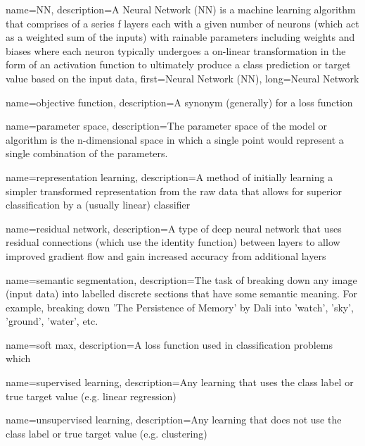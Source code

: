 {
    name={NN},
    description={A Neural Network (NN) is a machine learning algorithm that comprises of a series f layers each with a given number of neurons (which act as a weighted sum of the inputs) with rainable parameters including weights and biases where each neuron typically undergoes a on-linear transformation in the form of an activation function to ultimately produce a class prediction or target value based on the input data},
    first={Neural Network (NN)},
    long={Neural Network}
}

{
    name={objective function},
    description={A synonym (generally) for a loss function \cite[p.~80]{good_fellow_2016}}
}

{
    name={parameter space},
    description={The parameter space of the model or algorithm is the n-dimensional space in which a single point would represent a single combination of the parameters.}
}

{
    name=representation learning,
    description={A method of initially learning a simpler transformed representation from the raw data that allows for superior classification by a (usually linear) classifier}
}

{
    name=residual network,
    description={A type of deep neural network that uses residual connections (which use the identity function) between layers to allow improved gradient flow and gain increased accuracy from additional layers}
}

{
    name=semantic segmentation,
    description={The task of breaking down any image (input data) into labelled discrete sections that have some semantic meaning. For example, breaking down 'The Persistence of Memory' by Dali into 'watch', 'sky', 'ground', 'water', etc.}
}

{
    name=soft max,
    description={A loss function used in classification problems which } %
}

{
    name=supervised learning,
    description={Any learning that uses the class label or true target value (e.g. linear regression)}
}

{
    name=unsupervised learning,
    description={Any learning that does not use the class label or true target value (e.g. clustering)}
}

